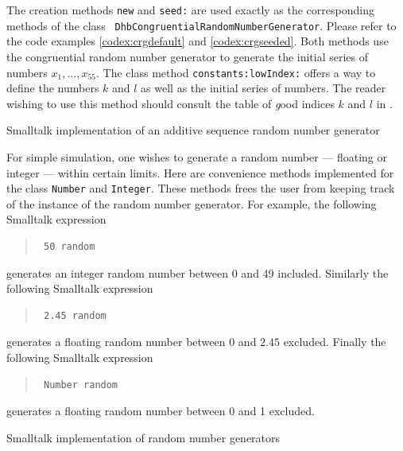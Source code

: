 The creation methods {\tt new} and {\tt seed:} are used exactly as
the corresponding methods of the class {\tt
DhbCongruentialRandomNumberGenerator}. Please refer to the code
examples \ref{codex:crgdefault} and \ref{codex:crgseeded}. Both
methods use the congruential random number generator to generate
the initial series of numbers $x_1,\ldots,x_{55}$. The class
method {\tt constants:lowIndex:} offers a way to define the
numbers $k$ and $l$ as well as the initial series of numbers. The
reader wishing to use this method should consult the table of {\textsl
good} indices $k$ and $l$ in \cite{Knuth2}.

\begin{listing} Smalltalk implementation of an additive sequence random number generator
\label{ls:randomseq}

\end{listing}

For simple simulation, one wishes to generate a random number ---
floating or integer --- within certain limits. Here are
convenience methods implemented for the class {\tt Number} and
{\tt Integer}. These methods frees the user from keeping track of
the instance of the random number generator. For example, the
following Smalltalk expression
\begin{quote}
\begin{verbatim}
 50 random
\end{verbatim}
\end{quote}
\noindent generates an integer random number between 0 and 49
included. Similarly the following Smalltalk expression
\begin{quote}
\begin{verbatim}
 2.45 random
\end{verbatim}
\end{quote}
\noindent generates a floating random number between 0 and $2.45$
excluded. Finally the following Smalltalk expression
\begin{quote}
\begin{verbatim}
 Number random
\end{verbatim}
\end{quote}
\noindent generates a floating random number between 0 and 1
excluded.
\begin{listing} Smalltalk implementation of random number generators
\label{ls:randomuse}


\end{listing}

